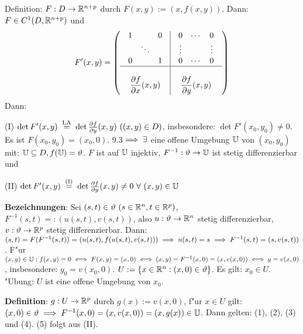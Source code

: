 \documentclass[a4paper,twoside,DIV15,BCOR12mm]{scrbook}
\begin{document}
\begin{beweis}
Definition: $F:D\to\mathbb{R}^{n+p}$ durch $F(x,y):=(x,f(x,y))$. Dann: $F\in C^1(D,\mathbb{R}^{n+p})$ und
$$
F'(x,y)=\left(\begin{array}{c|c}
\begin{array}{ccc}
1  &        & 0 \\
   & \ddots &   \\
0  &        & 1 \\
\end{array} & 
\begin{array}{ccc}
0  & \cdots & 0 \\
\vdots   &  & \vdots  \\
0  & \cdots & 0 \\
\end{array} \\
\hline\\
\displaystyle\frac{\partial f}{\partial x}(x,y)&
\displaystyle\frac{\partial f}{\partial y}(x,y)
\end{array}
\right)$$
Dann: \begin{liste}
\item[(I)] $\det F'(x,y)\gleichnach{LA}\det\frac{\partial f}{\partial y}(x,y)\ ((x, y) \in D)$, insbesondere: $\det F'(x_0, y_0)\ne 0$. Es ist $F(x_0, y_0)=(x_0, 0)$. 9.3$\implies\exists$ eine offene Umgebung $\mathbb{U}$ von $(x_0, y_0)$ mit: $\mathbb{U}\subseteq D, f(\mathbb{U})=\vartheta$. $F$ ist auf $\mathbb{U}$ injektiv, $F^{-1}:\vartheta\to\mathbb{U}$ ist stetig differenzierbar und
\item[(II)] $\det F'(x,y)\gleichnach{(I)}\det\frac{\partial f}{\partial y}(x,y)\ne 0\ \forall\ (x,y)\in\MdU$
\end{liste}
\textbf{Bezeichnungen}: Sei $(s,t)\in\vartheta\ (s\in\mathbb{R}^n, t\in\mathbb{R}^p)$, $F^{-1}(s,t)=:(u(s,t),v(s,t))$, also $u:\vartheta\to\mathbb{R}^n$ stetig differenzierbar, $v:\vartheta\to\mathbb{R}^p$ stetig differenzierbar. Dann: $(s,t)=F(F^{-1}(s,t))=(u(s,t),f(u(s,t),v(s,t)))\implies u(s,t)=s\implies F^{-1}(s,t)=(s,v(s,t))$. F"ur $(x,y)\in\mathbb{U}: f(x,y)=0\iff F(x,y)=(x,0)\iff(x,y)=F^{-1}(x,0)=(x,v(x,0))\iff y=v(x,0)$, insbesondere: $y_0=v(x_0,0)$. $U:=\{x\in\mathbb{R}^n: (x,0)\in\vartheta\}$. Es gilt: $x_0\in U$. "Ubung: $U$ ist eine offene Umgebung von $x_0$.

\textbf{Definition}: $g:U\to\mathbb{R}^p$ durch $g(x):=v(x,0)$, f"ur $x\in U$ gilt: $(x,0)\in\vartheta\implies F^{-1}(x,0)=(x,v(x,0))=(x,g(x))\in \mathbb{U}$. Dann gelten: (1), (2), (3) und (4). (5) folgt aus (II).


\end{beweis}
\end{document}
